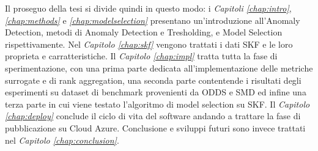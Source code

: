 Il proseguo della tesi si divide quindi in questo modo: i \textit{Capitoli \ref{chap:intro}}, \textit{\ref{chap:methods}} e \textit{\ref{chap:modelselection}} presentano un'introduzione all'Anomaly Detection, metodi di Anomaly Detection e Tresholding, e Model Selection rispettivamente. Nel \textit{Capitolo \ref{chap:skf}} vengono trattati i dati SKF e le loro proprieta e carratteristiche. Il \textit{Capitolo \ref{chap:impl}} tratta tutta la fase di sperimentazione, con una prima parte dedicata all'implementazione delle metriche surrogate e di rank aggregation, una seconda parte contentende i risultati degli esperimenti su dataset di benchmark provenienti da ODDS e SMD ed infine una terza parte in cui viene testato l'algoritmo di model selection su SKF. Il \textit{Capitolo \ref{chap:deploy}} conclude il ciclo di vita del software andando a trattare la fase di pubblicazione su Cloud Azure.
Conclusione e sviluppi futuri sono invece trattati nel \textit{Capitolo \ref{chap:conclusion}}.